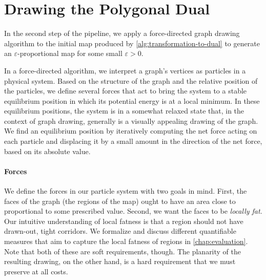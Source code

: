 \section{Drawing the Polygonal Dual}
\label{sect:drawing-the-dual}

In the second step of the pipeline, we apply a force-directed graph drawing algorithm to the initial map \initmap{} produced by \cref{alg:transformation-to-dual} to generate an $\varepsilon$-proportional map \propmap{} for some small $\varepsilon > 0$.

In a force-directed algorithm, we interpret a graph's vertices as particles in a physical system.
Based on the structure of the graph and the relative position of the particles, we define several forces that act to bring the system to a stable equilibrium position in which its potential energy is at a local minimum.
In these equilibrium positions, the system is in a somewhat relaxed state that, in the context of graph drawing, generally is a visually appealing drawing of the graph.
We find an equilibrium position by iteratively computing the net force acting on each particle and displacing it by a small amount in the direction of the net force, based on its absolute value.



\paragraph{Forces}

We define the forces in our particle system with two goals in mind.
First, the faces of the graph (the regions of the map) ought to have an area close to proportional to some prescribed value.
Second, we want the faces to be \emph{locally fat}.
Our intuitive understanding of local fatness is that a region should not have drawn-out, tight corridors.
We formalize and discuss different quantifiable measures that aim to capture the local fatness of regions in \cref{chap:evaluation}.
Note that both of these are soft requirements, though.
The planarity of the resulting drawing, on the other hand, is a hard requirement that we must preserve at all costs.

